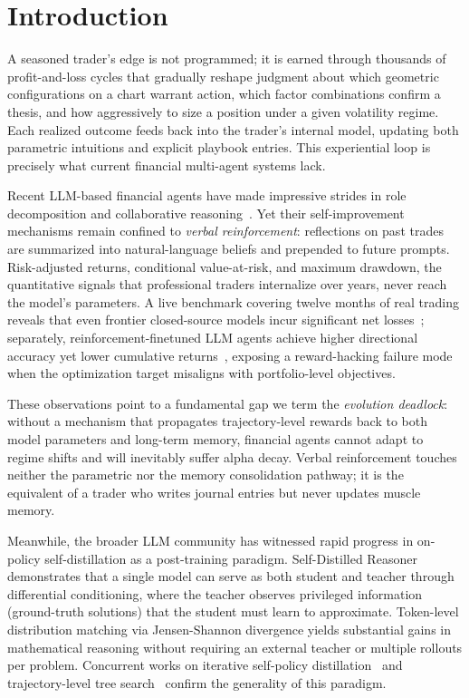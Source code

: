 \section{Introduction}
\label{sec:intro}

A seasoned trader's edge is not programmed; it is earned through thousands of profit-and-loss cycles that gradually reshape judgment about which geometric configurations on a chart warrant action, which factor combinations confirm a thesis, and how aggressively to size a position under a given volatility regime. Each realized outcome feeds back into the trader's internal model, updating both parametric intuitions and explicit playbook entries. This experiential loop is precisely what current financial multi-agent systems lack.

Recent LLM-based financial agents have made impressive strides in role decomposition and collaborative reasoning~\cite{tradingagents2025,fincon2024,finagent2024}. Yet their self-improvement mechanisms remain confined to \emph{verbal reinforcement}: reflections on past trades are summarized into natural-language beliefs and prepended to future prompts. Risk-adjusted returns, conditional value-at-risk, and maximum drawdown, the quantitative signals that professional traders internalize over years, never reach the model's parameters. A live benchmark covering twelve months of real trading reveals that even frontier closed-source models incur significant net losses~\cite{deepfund2025}; separately, reinforcement-finetuned LLM agents achieve higher directional accuracy yet lower cumulative returns~\cite{losingwinner2025}, exposing a reward-hacking failure mode when the optimization target misaligns with portfolio-level objectives.

These observations point to a fundamental gap we term the \emph{evolution deadlock}: without a mechanism that propagates trajectory-level rewards back to both model parameters and long-term memory, financial agents cannot adapt to regime shifts and will inevitably suffer alpha decay. Verbal reinforcement touches neither the parametric nor the memory consolidation pathway; it is the equivalent of a trader who writes journal entries but never updates muscle memory.

Meanwhile, the broader LLM community has witnessed rapid progress in on-policy self-distillation as a post-training paradigm. Self-Distilled Reasoner~\cite{opsd2026} demonstrates that a single model can serve as both student and teacher through differential conditioning, where the teacher observes privileged information (ground-truth solutions) that the student must learn to approximate. Token-level distribution matching via Jensen-Shannon divergence yields substantial gains in mathematical reasoning without requiring an external teacher or multiple rollouts per problem. Concurrent works on iterative self-policy distillation~\cite{crisp2026} and trajectory-level tree search~\cite{seea2025} confirm the generality of this paradigm.

